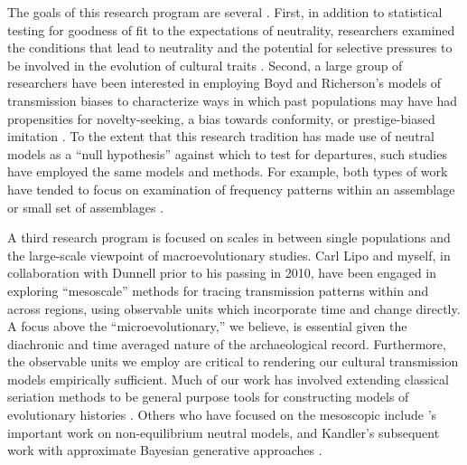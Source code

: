 The goals of this research program are several \citep{marwick2005can}.  First, in addition to statistical testing for goodness of fit to the expectations of neutrality, researchers examined the conditions that lead to neutrality and the potential for selective pressures to be involved in the evolution of cultural traits \citep{bettinger1999point,Bettinger2008,eerkens2005cultural,Evans2011,Pfeffer2001,steele2010ceramic,Wilhelmsen2001}.   Second, a large group of researchers have been interested in employing Boyd and Richerson's \citeyearpar{BR1985} models of transmission biases to characterize ways in which past populations may have had propensities for novelty-seeking, a bias towards conformity, or prestige-biased imitation  \citep{acerbi2014biases,Bentley2001,8913,Bentley2003,bentley2004random,Bentley2007b,bettinger1999point,Herzog2004,Kohler2004,Mesoudi2009,Shennan2001ceramic,shennan2008style}.  To the extent that this research tradition has made use of neutral models as a ``null hypothesis'' against which to test for departures, such studies have employed the same models and methods.  For example, both types of work have tended to focus on examination of frequency patterns within an assemblage or small set of assemblages \citep[see the detailed reviews by][]{kandler2019analysing,walsh2019introduction}.

A third research program is focused on scales in between single populations and the large-scale viewpoint of macroevolutionary studies.  Carl Lipo and myself, in collaboration with Dunnell prior to his passing in 2010, have been engaged in exploring ``mesoscale'' methods for tracing transmission patterns within and across regions, using observable units which incorporate time and change directly.  A focus above the ``microevolutionary,'' we believe, is essential given the diachronic and time averaged nature of the archaeological record.  Furthermore, the observable units we employ are critical to rendering our cultural transmission models empirically sufficient. Much of our work has involved extending classical seriation methods to be general purpose tools for constructing models of evolutionary histories \citep{Lipo1997,Lipo2001,Lipo2001neutrality,Lipo2005,Lipo2015,lipomadsen1997,lipomadsenhunt1995b,Madsen2008,Madsen2014,madsenlipo2015b}.  Others who have focused on the mesoscopic include \citet{Kandler2013}'s important work on non-equilibrium neutral models, and Kandler's subsequent work with approximate Bayesian generative approaches \citep{Kandler20150905,kandler2018generative,wilderkandler2015}.  

